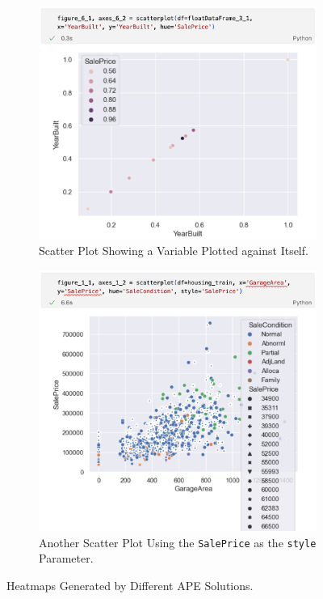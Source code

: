 \begin{figure}[h]
    \centering
    \begin{subfigure}[t]{.47\textwidth}
        \centering
        \includegraphics[width=\textwidth]{Tex//images//native_ape_eval//scatterplot_year.png}
        \caption{Scatter Plot Showing a Variable Plotted against Itself.}
        \label{fig:native_ape_scatterplot_year}
    \end{subfigure}%
    \hfill
    \begin{subfigure}[t]{.47\textwidth}
        \centering
        \includegraphics[width=\textwidth]{Tex//images//native_ape_eval//scatterplot_marker.png}
        \caption{Another Scatter Plot Using the \texttt{SalePrice} as the \texttt{style} Parameter.}
        \label{fig:native_ape_scatterplot_marker}
    \end{subfigure}
    \caption{Heatmaps Generated by Different APE Solutions.}
    \label{fig:native_ape_double_scatterplot}
\end{figure}


